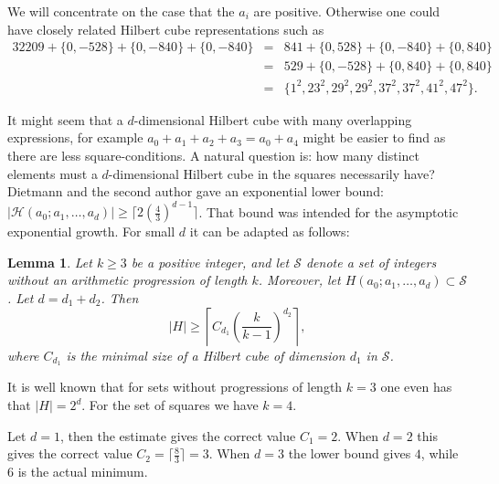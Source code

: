 \documentclass[10pt]{amsart}
\theoremstyle{plain}
\newtheorem{lem}[thm]{Lemma}
\def\cal{\mathcal}
\begin{document}
We will concentrate on the case that the $a_i$ are positive.
Otherwise one could have closely related Hilbert cube representations such as
\begin{alignat*}{3}
2209 + \{0, -528\} + \{0, -840\}+ \{0, -840\} &=&
841 + \{0, 528\} + \{0, -840\}+ \{0, 840\}\\ 
&=&
529 + \{0, -528\} + \{0, 840\}+ \{0, 840\}\\
&=&\{1^2, 23^2, 29^2, 29^2, 37^2, 37^2, 41^2, 47^2\}.
\end{alignat*}

It might seem that a $d$-dimensional Hilbert cube with many overlapping expressions, for example $a_0+a_1+a_2+a_3=a_0+a_4$ might be easier to find as there are less square-conditions. A natural question is: how many distinct elements must a $d$-dimensional Hilbert cube in the squares necessarily have?
Dietmann and the second author \cite[Lemma 1.4]{Dietmann-Elsholtz:2015} gave an exponential lower bound:
$|\cal{H}(a_0;a_1, \ldots, a_d)|\geq \lceil 2 (\frac{4}{3})^{d-1}\rceil$.
That bound was intended for the asymptotic exponential growth.
For small $d$ it can be adapted as follows:
\begin{lem}
Let $k \geq 3$ be a positive integer, and let $\cal{S}$ denote a set of integers without an arithmetic progression of length $k$. 
Moreover, let $H(a_0; a_1, \ldots , a_d) \subset \cal{S}$. Let $d=d_1+d_2$. Then
\[|H| \geq \left\lceil C_{d_1}  (\frac{k}{k-1})^{d_2}\right\rceil, \]
where $C_{d_1}$ is the minimal size of a Hilbert cube of dimension $d_1$ in ${\cal S}$.
\end{lem}
It is well known that for sets without progressions of length $k= 3$ one even has that $|H| = 2^d$. For the set of squares we have $k=4$.

Let $d=1$, then the estimate gives the correct value $C_1=2$. When $d=2$ this gives the correct value $C_2=\lceil\frac{8}{3}\rceil=3$. 
When $d=3$ the lower bound gives $4$, while $6$ is the actual minimum. 

\end{document}
